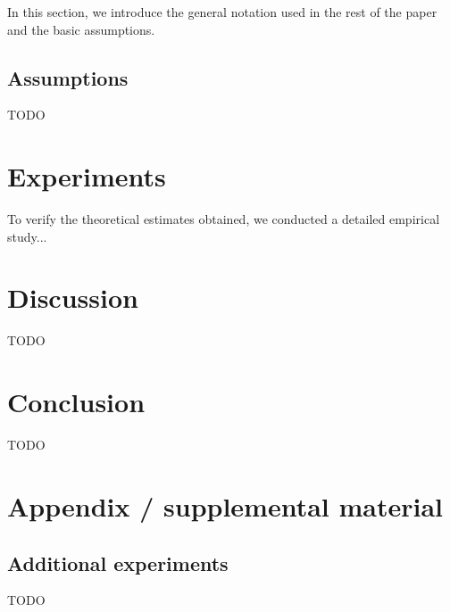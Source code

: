 \documentclass{article}
\begin{document}
In this section, we introduce the general notation used in the rest of the paper and the basic assumptions. 

\subsection{Assumptions} 

TODO

\section{Experiments}\label{sec:exp}

To verify the theoretical estimates obtained, we conducted a detailed empirical study...

\section{Discussion}\label{sec:disc}

TODO

\section{Conclusion}\label{sec:concl}

TODO







\newpage
\appendix
\section{Appendix / supplemental material}\label{app}

\subsection{Additional experiments}\label{app:exp}

TODO
\end{document}
